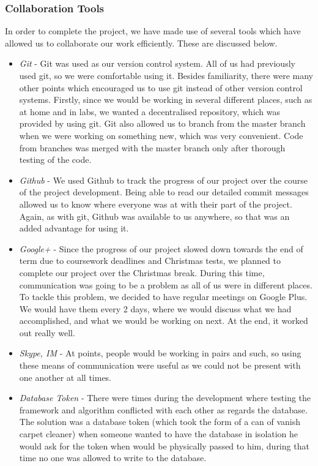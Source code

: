 \documentclass[11pt]{article}
\begin{document}
\subsubsection{Collaboration Tools}

In order to complete the project, we have made use of several tools which have
allowed us to collaborate our work efficiently. These are discussed below.

\begin{itemize}
\item 
\emph{Git} - Git was used as our version control system. All of us had previously
used git, so we were comfortable using it. Besides familiarity, there were
many other points which encouraged us to use git instead of other version control
systems. Firstly, since we would be working in several different places, such as
at home and in labs, we wanted a decentralised repository, which was provided
by using git. Git also allowed us to branch from the master branch when we were
working on something new, which was very convenient. Code from branches was
merged with the master branch only after thorough testing of the code.
\item 
\emph{Github} - We used Github to track the progress of our project over the course
of the project development. Being able to read our detailed commit messages
allowed us to know where everyone was at with their part of the project. Again,
as with git, Github was available to us anywhere, so that was an added advantage
for using it.
\item 
\emph{Google+} - Since the progress of our project slowed down towards the end
of term due to coursework deadlines and Christmas tests, we planned to complete
our project over the Christmas break. During this time, communication was going
to be a problem as all of us were in different places. To tackle this problem,
we decided to have regular meetings on Google Plus. We would have them every 2
days, where we would discuss what we had accomplished, and what we would be working
on next. At the end, it worked out really well.
\item 
\emph{Skype, IM} - At points, people would be working in pairs and such, so using
these means of communication were useful as we could not be present with one
another at all times.
\item
\emph{Database Token} - There were times during the development where testing the
framework and algorithm conflicted with each other as regards the database. The solution 
was a database token (which took the form of a can of vanish carpet cleaner) when someone
wanted to have the database in isolation he would ask for the token when would be physically
passed to him, during that time no one was allowed to write to the database.

\end{itemize}
\end{document}
